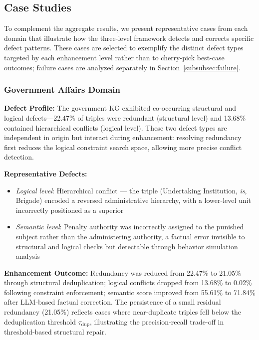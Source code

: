 \documentclass[runningheads]{llncs}
\begin{document}
\subsection{Case Studies}

To complement the aggregate results, we present representative cases from each domain that illustrate how the three-level framework detects and corrects specific defect patterns. These cases are selected to exemplify the distinct defect types targeted by each enhancement level rather than to cherry-pick best-case outcomes; failure cases are analyzed separately in Section~\ref{subsubsec:failure}.

\subsubsection{Government Affairs Domain}
\textbf{Defect Profile:} The government KG exhibited co-occurring structural and logical defects—22.47\% of triples were redundant (structural level) and 13.68\% contained hierarchical conflicts (logical level). These two defect types are independent in origin but interact during enhancement: resolving redundancy first reduces the logical constraint search space, allowing more precise conflict detection.

\textbf{Representative Defects:}
\begin{itemize}
    \item \textit{Logical level}: Hierarchical conflict — the triple (Undertaking Institution, \textit{is}, Brigade) encoded a reversed administrative hierarchy, with a lower-level unit incorrectly positioned as a superior
    \item \textit{Semantic level}: Penalty authority was incorrectly assigned to the punished subject rather than the administering authority, a factual error invisible to structural and logical checks but detectable through behavior simulation analysis
\end{itemize}

\textbf{Enhancement Outcome:} Redundancy was reduced from 22.47\% to 21.05\% through structural deduplication; logical conflicts dropped from 13.68\% to 0.02\% following constraint enforcement; semantic score improved from 55.61\% to 71.84\% after LLM-based factual correction. The persistence of a small residual redundancy (21.05\%) reflects cases where near-duplicate triples fell below the deduplication threshold $\tau_{\text{dup}}$, illustrating the precision-recall trade-off in threshold-based structural repair.
\end{document}
